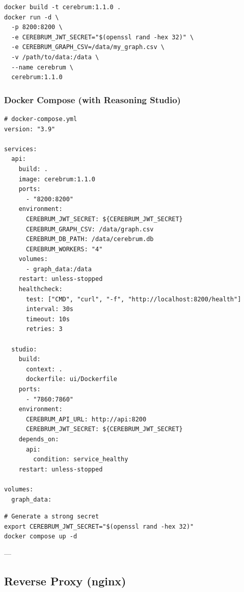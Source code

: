 \documentclass[11pt,article,oneside]{memoir}
\begin{document}
\begin{lstlisting}
docker build -t cerebrum:1.1.0 .
docker run -d \
  -p 8200:8200 \
  -e CEREBRUM_JWT_SECRET="$(openssl rand -hex 32)" \
  -e CEREBRUM_GRAPH_CSV=/data/my_graph.csv \
  -v /path/to/data:/data \
  --name cerebrum \
  cerebrum:1.1.0
\end{lstlisting}

\subsubsection{Docker Compose (with Reasoning Studio)}

\begin{lstlisting}
# docker-compose.yml
version: "3.9"

services:
  api:
    build: .
    image: cerebrum:1.1.0
    ports:
      - "8200:8200"
    environment:
      CEREBRUM_JWT_SECRET: ${CEREBRUM_JWT_SECRET}
      CEREBRUM_GRAPH_CSV: /data/graph.csv
      CEREBRUM_DB_PATH: /data/cerebrum.db
      CEREBRUM_WORKERS: "4"
    volumes:
      - graph_data:/data
    restart: unless-stopped
    healthcheck:
      test: ["CMD", "curl", "-f", "http://localhost:8200/health"]
      interval: 30s
      timeout: 10s
      retries: 3

  studio:
    build:
      context: .
      dockerfile: ui/Dockerfile
    ports:
      - "7860:7860"
    environment:
      CEREBRUM_API_URL: http://api:8200
      CEREBRUM_JWT_SECRET: ${CEREBRUM_JWT_SECRET}
    depends_on:
      api:
        condition: service_healthy
    restart: unless-stopped

volumes:
  graph_data:
\end{lstlisting}

\begin{lstlisting}
# Generate a strong secret
export CEREBRUM_JWT_SECRET="$(openssl rand -hex 32)"
docker compose up -d
\end{lstlisting}

---

\subsection{Reverse Proxy (nginx)}
\end{document}
